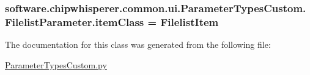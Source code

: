 \subsubsection[{item\+Class}]{\setlength{\rightskip}{0pt plus 5cm}software.\+chipwhisperer.\+common.\+ui.\+Parameter\+Types\+Custom.\+Filelist\+Parameter.\+item\+Class = {\bf Filelist\+Item}\hspace{0.3cm}{\ttfamily [static]}}\label{classsoftware_1_1chipwhisperer_1_1common_1_1ui_1_1ParameterTypesCustom_1_1FilelistParameter_ab3b4b9f74d56f2dc63054dcdce422314}


The documentation for this class was generated from the following file\+:\begin{DoxyCompactItemize}
\item 
\hyperlink{ParameterTypesCustom_8py}{Parameter\+Types\+Custom.\+py}\end{DoxyCompactItemize}
